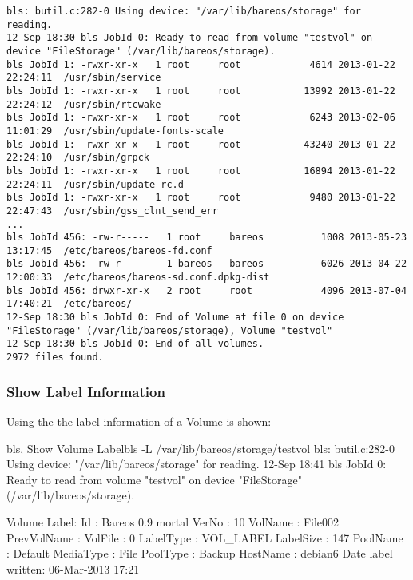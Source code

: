 \footnotesize
\begin{verbatim}
bls: butil.c:282-0 Using device: "/var/lib/bareos/storage" for reading.
12-Sep 18:30 bls JobId 0: Ready to read from volume "testvol" on device "FileStorage" (/var/lib/bareos/storage).
bls JobId 1: -rwxr-xr-x   1 root     root            4614 2013-01-22 22:24:11  /usr/sbin/service
bls JobId 1: -rwxr-xr-x   1 root     root           13992 2013-01-22 22:24:12  /usr/sbin/rtcwake
bls JobId 1: -rwxr-xr-x   1 root     root            6243 2013-02-06 11:01:29  /usr/sbin/update-fonts-scale
bls JobId 1: -rwxr-xr-x   1 root     root           43240 2013-01-22 22:24:10  /usr/sbin/grpck
bls JobId 1: -rwxr-xr-x   1 root     root           16894 2013-01-22 22:24:11  /usr/sbin/update-rc.d
bls JobId 1: -rwxr-xr-x   1 root     root            9480 2013-01-22 22:47:43  /usr/sbin/gss_clnt_send_err
...
bls JobId 456: -rw-r-----   1 root     bareos          1008 2013-05-23 13:17:45  /etc/bareos/bareos-fd.conf
bls JobId 456: -rw-r-----   1 bareos   bareos          6026 2013-04-22 12:00:33  /etc/bareos/bareos-sd.conf.dpkg-dist
bls JobId 456: drwxr-xr-x   2 root     root            4096 2013-07-04 17:40:21  /etc/bareos/
12-Sep 18:30 bls JobId 0: End of Volume at file 0 on device "FileStorage" (/var/lib/bareos/storage), Volume "testvol"
12-Sep 18:30 bls JobId 0: End of all volumes.
2972 files found.
\end{verbatim}
\normalsize


\subsubsection{Show Label Information}

Using the  the label information of a Volume is shown:

\begin{commandOut}{bls, Show Volume Label}{}{bls -L /var/lib/bareos/storage/testvol}
bls: butil.c:282-0 Using device: "/var/lib/bareos/storage" for reading.
12-Sep 18:41 bls JobId 0: Ready to read from volume "testvol" on device "FileStorage" (/var/lib/bareos/storage).

Volume Label:
Id                : Bareos 0.9 mortal
VerNo             : 10
VolName           : File002
PrevVolName       :
VolFile           : 0
LabelType         : VOL_LABEL
LabelSize         : 147
PoolName          : Default
MediaType         : File
PoolType          : Backup
HostName          : debian6
Date label written: 06-Mar-2013 17:21
\end{commandOut}


